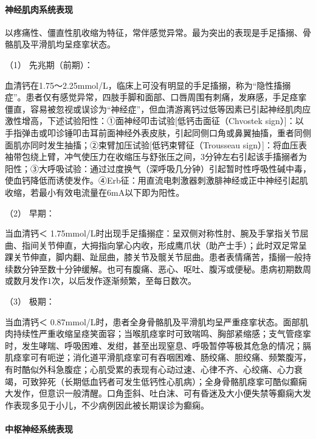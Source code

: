 \paragraph{神经肌肉系统表现}

以疼痛性、僵直性肌收缩为特征，常伴感觉异常。最为突出的表现是手足搐搦、骨骼肌及平滑肌均呈痉挛状态。

\hypertarget{text00199.htmlux5cux23CHP6-4-1-2-2-1-1}{}
（1） 先兆期（前期）：

血清钙在1.75～2.25mmol/L，临床上可没有明显的手足搐搦，称为“隐性搐搦症”。患者仅有感觉异常，四肢手脚和面部、口唇周围有刺痛，发麻感，手足痉挛僵直，容易被忽视或误诊为“神经症”，但血清游离钙过低等因素已引起神经肌肉应激性增高，下述试验阳性：①面神经叩击试验{[}低钙击面征（Chvostek
sign）{]}：以手指弹击或叩诊锤叩击耳前面神经外表皮肤，引起同侧口角或鼻翼抽搐，重者同侧面肌亦同时发生抽搐；②束臂加压试验{[}低钙束臂征（Trousseau
sign）{]}：将血压表袖带包绕上臂，冲气使压力在收缩压与舒张压之间，3分钟左右引起该手搐搦者为阳性；③大呼吸试验：通过过度换气（深呼吸几分钟）引起暂时性呼吸性碱中毒，使血钙降低而诱使发作。④Erb征：用直流电刺激器刺激腓神经或正中神经引起肌收缩，若最小有效电流量在6mA以下即为阳性。

\hypertarget{text00199.htmlux5cux23CHP6-4-1-2-2-1-2}{}
（2） 早期：

当血清钙＜
1.75mmol/L时出现手足搐搦症：呈双侧对称性肘、腕及手掌指关节屈曲、指间关节伸直，大拇指向掌心内收，形成鹰爪状（助产士手）；此时双足常呈踝关节伸直，脚内翻、趾屈曲，膝关节及髋关节屈曲。患者表情痛苦，搐搦一般持续数分钟至数十分钟缓解。也可有腹痛、恶心、呕吐、腹泻或便秘。患病初期数周或数月发作1次，以后发作逐渐频繁，至每日数次。

\hypertarget{text00199.htmlux5cux23CHP6-4-1-2-2-1-3}{}
（3） 极期：

当血清钙＜
0.87mmol/L时，患者全身骨骼肌及平滑肌均呈严重痉挛状态。面部肌肉持续性严重收缩呈痉笑面容；当喉肌痉挛时可致喘鸣、胸部紧缩感；支气管痉挛时，发生哮喘、呼吸困难、发绀，甚至出现窒息、呼吸暂停等极其危急的情况；膈肌痉挛可有呃逆；消化道平滑肌痉挛可有吞咽困难、肠绞痛、胆绞痛、频繁腹泻，有时酷似外科急腹症；心肌受累的表现有心动过速、心律不齐、心绞痛、心力衰竭，可致猝死（长期低血钙者可发生低钙性心肌病）；全身骨骼肌痉挛可酷似癫痫大发作，但意识一般清醒。口角歪斜、吐白沫、可有昏迷及大小便失禁等癫痫大发作表现多见于小儿，不少病例因此被长期误诊为癫痫。

\paragraph{中枢神经系统表现}

